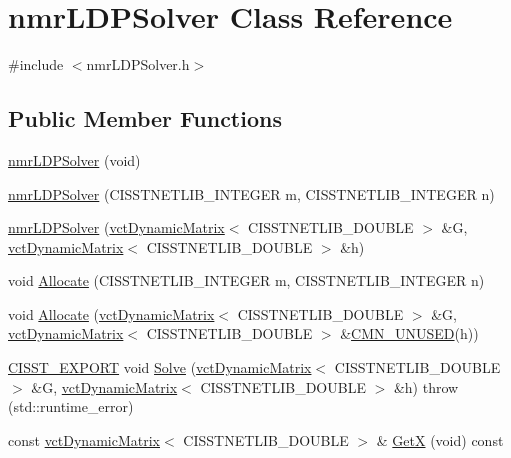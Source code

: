 \hypertarget{classnmr_l_d_p_solver}{}\section{nmr\+L\+D\+P\+Solver Class Reference}
\label{classnmr_l_d_p_solver}


{\ttfamily \#include $<$nmr\+L\+D\+P\+Solver.\+h$>$}

\subsection*{Public Member Functions}
\begin{DoxyCompactItemize}
\item 
\hyperlink{classnmr_l_d_p_solver_a2ca6b6e49006da3d209024e7160db2d9}{nmr\+L\+D\+P\+Solver} (void)
\item 
\hyperlink{classnmr_l_d_p_solver_a8b7862d241f3580f6b31a47719396cb6}{nmr\+L\+D\+P\+Solver} (C\+I\+S\+S\+T\+N\+E\+T\+L\+I\+B\+\_\+\+I\+N\+T\+E\+G\+E\+R m, C\+I\+S\+S\+T\+N\+E\+T\+L\+I\+B\+\_\+\+I\+N\+T\+E\+G\+E\+R n)
\item 
\hyperlink{classnmr_l_d_p_solver_a93ec0c9e50f72abfe4f82e8196a715b8}{nmr\+L\+D\+P\+Solver} (\hyperlink{classvct_dynamic_matrix}{vct\+Dynamic\+Matrix}$<$ C\+I\+S\+S\+T\+N\+E\+T\+L\+I\+B\+\_\+\+D\+O\+U\+B\+L\+E $>$ \&G, \hyperlink{classvct_dynamic_matrix}{vct\+Dynamic\+Matrix}$<$ C\+I\+S\+S\+T\+N\+E\+T\+L\+I\+B\+\_\+\+D\+O\+U\+B\+L\+E $>$ \&h)
\item 
void \hyperlink{classnmr_l_d_p_solver_a524b7eeead23153401f96e4d932f35f7}{Allocate} (C\+I\+S\+S\+T\+N\+E\+T\+L\+I\+B\+\_\+\+I\+N\+T\+E\+G\+E\+R m, C\+I\+S\+S\+T\+N\+E\+T\+L\+I\+B\+\_\+\+I\+N\+T\+E\+G\+E\+R n)
\item 
void \hyperlink{classnmr_l_d_p_solver_a7707014b8435c8c5b99cc31b50e2cafa}{Allocate} (\hyperlink{classvct_dynamic_matrix}{vct\+Dynamic\+Matrix}$<$ C\+I\+S\+S\+T\+N\+E\+T\+L\+I\+B\+\_\+\+D\+O\+U\+B\+L\+E $>$ \&G, \hyperlink{classvct_dynamic_matrix}{vct\+Dynamic\+Matrix}$<$ C\+I\+S\+S\+T\+N\+E\+T\+L\+I\+B\+\_\+\+D\+O\+U\+B\+L\+E $>$ \&\hyperlink{cmn_portability_8h_a021894e2626935fa2305434b1e893ff6}{C\+M\+N\+\_\+\+U\+N\+U\+S\+E\+D}(h))
\item 
\hyperlink{cmn_export_macros_8h_a99393e0c3ac434b2605235bbe20684f8}{C\+I\+S\+S\+T\+\_\+\+E\+X\+P\+O\+R\+T} void \hyperlink{classnmr_l_d_p_solver_a6d849aede8a216bfe149fa3a3bfb0a9e}{Solve} (\hyperlink{classvct_dynamic_matrix}{vct\+Dynamic\+Matrix}$<$ C\+I\+S\+S\+T\+N\+E\+T\+L\+I\+B\+\_\+\+D\+O\+U\+B\+L\+E $>$ \&G, \hyperlink{classvct_dynamic_matrix}{vct\+Dynamic\+Matrix}$<$ C\+I\+S\+S\+T\+N\+E\+T\+L\+I\+B\+\_\+\+D\+O\+U\+B\+L\+E $>$ \&h)  throw (std\+::runtime\+\_\+error)
\item 
const \hyperlink{classvct_dynamic_matrix}{vct\+Dynamic\+Matrix}$<$ C\+I\+S\+S\+T\+N\+E\+T\+L\+I\+B\+\_\+\+D\+O\+U\+B\+L\+E $>$ \& \hyperlink{classnmr_l_d_p_solver_ad3a6584125d6ebfe629b9edc3312a536}{Get\+X} (void) const 
\end{DoxyCompactItemize}
